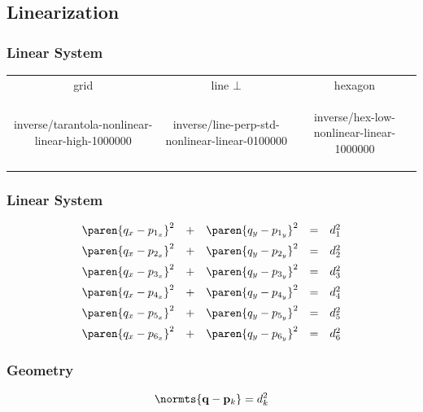 \subsection{Linearization}
%
\begin{frame}\frametitle{Linear System}
\begin{table}[htp]
\begin{center}
	\begin{tabular}{ccc}
		grid & line $\bot$ & hexagon \\
		\begin{overpic}[ scale = 0.325 ] {\pLocalGraphics inverse/tarantola-nonlinear-linear-high-1000000} \end{overpic} &
		\begin{overpic}[ scale = 0.325 ] {\pLocalGraphics inverse/line-perp-std-nonlinear-linear-0100000} \end{overpic} &
		\begin{overpic}[ scale = 0.325 ] {\pLocalGraphics inverse/hex-low-nonlinear-linear-1000000} \end{overpic} 
	\end{tabular}
\end{center}
\end{table}%
\end{frame}
%
\begin{frame}\frametitle{Linear System}
\begin{equation}
\begin{array}{ccccc}
	\paren{q_{x} - p_{1_{x}}}^{2} &+& \paren{q_{y} - p_{1_{y}}}^{2} &=& d_{1}^{2} \\[5pt]
	\paren{q_{x} - p_{2_{x}}}^{2} &+& \paren{q_{y} - p_{2_{y}}}^{2} &=& d_{2}^{2} \\[5pt]
	\paren{q_{x} - p_{3_{x}}}^{2} &+& \paren{q_{y} - p_{3_{y}}}^{2} &=& d_{3}^{2} \\[5pt]
	\paren{q_{x} - p_{4_{x}}}^{2} &+& \paren{q_{y} - p_{4_{y}}}^{2} &=& d_{4}^{2} \\[5pt]
	\paren{q_{x} - p_{5_{x}}}^{2} &+& \paren{q_{y} - p_{5_{y}}}^{2} &=& d_{5}^{2} \\[5pt]
	\paren{q_{x} - p_{6_{x}}}^{2} &+& \paren{q_{y} - p_{6_{y}}}^{2} &=& d_{6}^{2} \\
\end{array}
\label{eq:linear-system}
\end{equation}
\end{frame}
%
%
\begin{frame}\frametitle{Geometry}
\begin{equation}
	\normts{\mathbf{q} - \mathbf{p}_{k}} = d_{k}^{2}
\label{eq:model}
\end{equation}
\end{frame}
%


